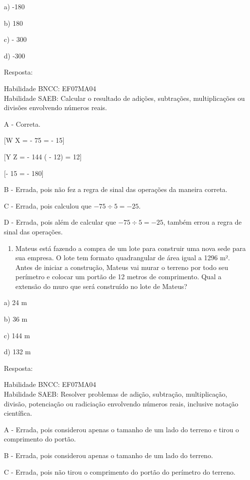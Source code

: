 a) -180

b) 180

c) - 300

d) -300

Resposta:

Habilidade BNCC: EF07MA04\\
Habilidade SAEB: Calcular o resultado de adições, subtrações,
multiplicações ou divisões envolvendo números reais.

A - Correta.

[W \div X = - 75  = - 15]

[Y \div Z = - 144 \div ( - 12) = 12]

[- 15  = - 180]

B - Errada, pois não fez a regra de sinal das operações da maneira
correta.

C - Errada, pois calculou que \(- 75 \div 5 = - 25\).

D - Errada, pois além de calcular que \(- 75 \div 5 = - 25\), também
errou a regra de sinal das operações.

\begin{enumerate}
\def\labelenumi{\arabic{enumi})}
\setcounter{enumi}{2}
\tightlist
\item
  Mateus está fazendo a compra de um lote para construir uma nova sede
  para sua empresa. O lote tem formato quadrangular de área igual a 1296
  m². Antes de iniciar a construção, Mateus vai murar o terreno por todo
  seu perímetro e colocar um portão de 12 metros de comprimento. Qual a
  extensão do muro que será construído no lote de Mateus?
\end{enumerate}

a) 24 m

b) 36 m

c) 144 m

d) 132 m

Resposta:

Habilidade BNCC: EF07MA04\\
Habilidade SAEB: Resolver problemas de adição, subtração, multiplicação,
divisão, potenciação ou radiciação envolvendo números reais, inclusive
notação científica.

A - Errada, pois considerou apenas o tamanho de um lado do terreno e
tirou o comprimento do portão.

B - Errada, pois considerou apenas o tamanho de um lado do terreno.

C - Errada, pois não tirou o comprimento do portão do perímetro do
terreno.

